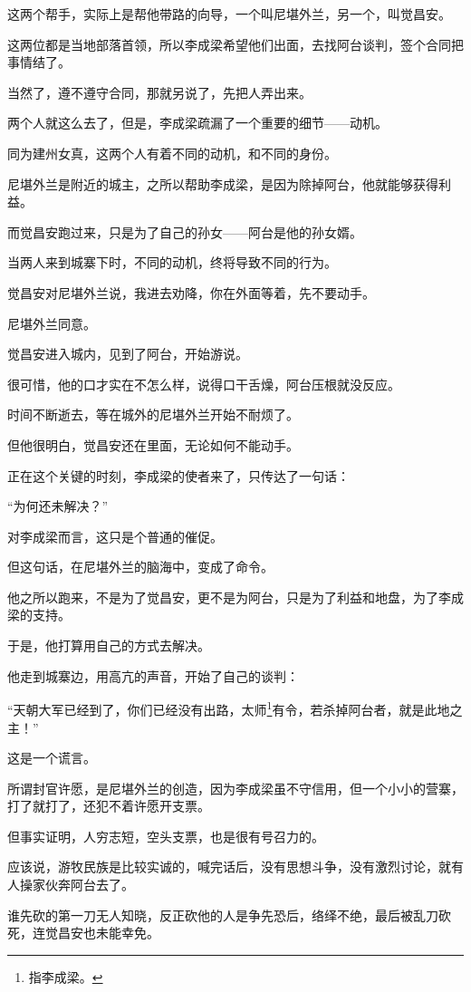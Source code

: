\begin{multicols}{\theparacolNo}
这两个帮手，实际上是帮他带路的向导，一个叫尼堪外兰，另一个，叫觉昌安。

这两位都是当地部落首领，所以李成梁希望他们出面，去找阿台谈判，签个合同把事情结了。

当然了，遵不遵守合同，那就另说了，先把人弄出来。

两个人就这么去了，但是，李成梁疏漏了一个重要的细节——动机。

同为建州女真，这两个人有着不同的动机，和不同的身份。

尼堪外兰是附近的城主，之所以帮助李成梁，是因为除掉阿台，他就能够获得利益。

而觉昌安跑过来，只是为了自己的孙女——阿台是他的孙女婿。

当两人来到城寨下时，不同的动机，终将导致不同的行为。

觉昌安对尼堪外兰说，我进去劝降，你在外面等着，先不要动手。

尼堪外兰同意。

觉昌安进入城内，见到了阿台，开始游说。

很可惜，他的口才实在不怎么样，说得口干舌燥，阿台压根就没反应。

时间不断逝去，等在城外的尼堪外兰开始不耐烦了。

但他很明白，觉昌安还在里面，无论如何不能动手。

正在这个关键的时刻，李成梁的使者来了，只传达了一句话：

“为何还未解决？”

对李成梁而言，这只是个普通的催促。

但这句话，在尼堪外兰的脑海中，变成了命令。

他之所以跑来，不是为了觉昌安，更不是为阿台，只是为了利益和地盘，为了李成梁的支持。

于是，他打算用自己的方式去解决。

他走到城寨边，用高亢的声音，开始了自己的谈判：

“天朝大军已经到了，你们已经没有出路，太师\footnote{指李成梁。}有令，若杀掉阿台者，就是此地之主！”

这是一个谎言。

所谓封官许愿，是尼堪外兰的创造，因为李成梁虽不守信用，但一个小小的营寨，打了就打了，还犯不着许愿开支票。

但事实证明，人穷志短，空头支票，也是很有号召力的。

应该说，游牧民族是比较实诚的，喊完话后，没有思想斗争，没有激烈讨论，就有人操家伙奔阿台去了。

谁先砍的第一刀无人知晓，反正砍他的人是争先恐后，络绎不绝，最后被乱刀砍死，连觉昌安也未能幸免。


\end{multicols}
